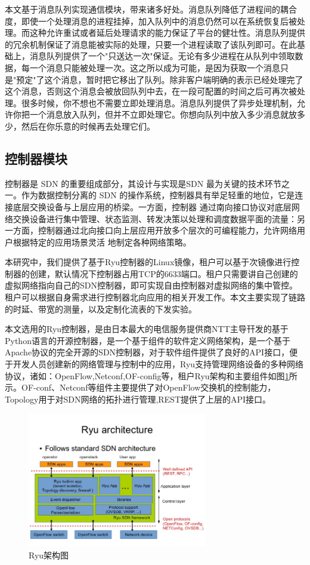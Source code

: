 本文基于消息队列实现通信模块，带来诸多好处。消息队列降低了进程间的耦合度，即使一个处理消息的进程挂掉，加入队列中的消息仍然可以在系统恢复后被处理。而这种允许重试或者延后处理请求的能力保证了平台的健壮性。消息队列提供的冗余机制保证了消息能被实际的处理，只要一个进程读取了该队列即可。在此基础上，消息队列提供了一个"只送达一次"保证。无论有多少进程在从队列中领取数据，每一个消息只能被处理一次。这之所以成为可能，是因为获取一个消息只是"预定"了这个消息，暂时把它移出了队列。除非客户端明确的表示已经处理完了这个消息，否则这个消息会被放回队列中去，在一段可配置的时间之后可再次被处理。很多时候，你不想也不需要立即处理消息。消息队列提供了异步处理机制，允许你把一个消息放入队列，但并不立即处理它。你想向队列中放入多少消息就放多少，然后在你乐意的时候再去处理它们。

\subsection{控制器模块}
控制器是 SDN 的重要组成部分，其设计与实现是SDN 最为关键的技术环节之一。作为数据控制分离的
SDN 的操作系统，控制器具有举足轻重的地位，它是连接底层交换设备与上层应用的桥梁。一方面，控制器
通过南向接口协议对底层网络交换设备进行集中管理、状态监测、转发决策以处理和调度数据平面的流量：另
一方面，控制器通过北向接口向上层应用开放多个层次的可编程能力，允许网络用户根据特定的应用场景灵活
地制定各种网络策略。

本研究中，我们提供了基于Ryu控制器的Linux镜像，租户可以基于次镜像进行控制器的创建，默认情况下控制器占用TCP的6633端口。租户只需要讲自己创建的虚拟网络指向自己的SDN控制器，即可实现自由控制器对虚拟网络的集中管控。租户可以根据自身需求进行控制器北向应用的相关开发工作。本文主要实现了链路的时延、带宽的测量，以及定制化流表的下发实验。

本文选用的Ryu控制器，是由日本最大的电信服务提供商NTT主导幵发的基于Python语言的开源控制器，是一个基于组件的软件定义网络架构，是一个基于Apache协议的完全开源的SDN控制器，对于软件组件提供了良好的API接口，便于开发人员创建新的网络管理与控制中的应用，Ryu支持管理网络设备的多种网络协议，诸如：OpenFlow,Netconf,OF-config等，租户Ryu架构和主要组件如图\ref{fig:ryu}所示。OF-conf、Netconf等组件主要提供了对OpenFlow交换机的控制能力，Topology用于对SDN网络的拓扑进行管理,REST提供了上层的API接口。

\begin{figure}[!htb]
  \centering
  \includegraphics[width=0.7\textwidth]{logo/ryu.jpg}
  \caption{Ryu架构图}
  \label{fig:ryu}
\end{figure}

